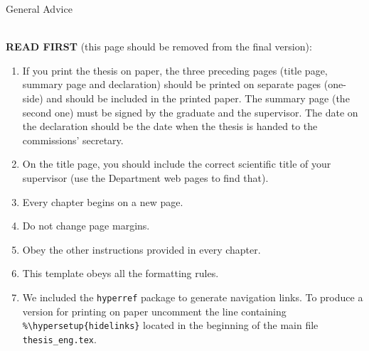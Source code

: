 \thispagestyle{empty}
\begin{center}\large
	General Advice
\end{center}
~\\

{\color{red}\large{\bf READ FIRST} (this page should be removed from the final version)}:\\
\begin{enumerate}
	\item	If you print the thesis on paper, the three preceding pages (title page, summary page and declaration) should be printed on separate pages (one-side) and should be included in the printed paper. The summary page (the second one) must be signed by the graduate and the supervisor. The date on the declaration should be the date when the thesis is handed to the commissions’ secretary.
	\item	On the title page, you should include the correct scientific title of your supervisor (use the Department web pages to find that).
	\item Every chapter begins on a new page.
	\item Do not change page margins.
	\item Obey the other instructions provided in every chapter.
	\item This template obeys all the formatting rules.
	\item We included the \verb+hyperref+ package to generate navigation links. To produce  a version for printing on paper uncomment the line containing \verb+%\hypersetup{hidelinks}+
	located in the beginning of the main file \verb+thesis_eng.tex+.
\end{enumerate}
